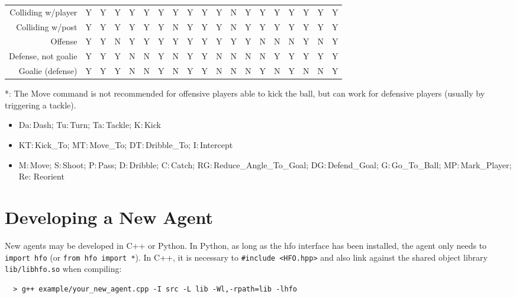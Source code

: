\documentclass[12pt]{article}
\begin{document}
\begin{center}
{\begin{tabular}{r       | c    c    c    c | c    c    c    c | c   c   c   c   c   c    c    c   c    c}
Colliding w/player      & Y  & Y  & Y  & Y & Y  & Y  & Y  & Y & Y & Y & N & Y & Y & Y  & Y  & Y & Y  & Y \\
Colliding w/post        & Y  & Y  & Y  & Y & Y  & Y  & N  & Y & Y & Y & N & Y & Y & Y  & Y  & Y & Y  & Y \\
\hline
Offense                 & Y  & Y  & N  & Y & Y  & Y  & Y  & Y & Y & Y & Y & Y & N & N  & N  & Y & N  & Y \\
Defense, not goalie     & Y  & Y  & Y  & N & N  & Y  & N  & Y & Y & N & N & N & N & Y  & Y  & Y & Y  & Y \\
Goalie (defense)        & Y  & Y  & Y  & N & N  & Y  & N  & Y & Y & N & N & N & Y & N  & Y  & N & N  & Y \\
\end{tabular}
}
\end{center}
*: The Move command is not recommended for offensive players able to kick the ball, but can work for defensive players (usually by triggering a tackle).\\
\begin{itemize}[noitemsep]
\item{Da:\,Dash; Tu:\,Turn; Ta:\,Tackle; K:\,Kick}
\item{KT:\,Kick\_To; MT:\,Move\_To; DT:\,Dribble\_To; I:\,Intercept}
\item{M:\,Move; S:\,Shoot; P:\,Pass; D:\,Dribble; C:\,Catch; RG:\,Reduce\_Angle\_To\_Goal; DG:\,Defend\_Goal; G:\,Go\_To\_Ball; MP:\,Mark\_Player; Re: Reorient}
\end{itemize}

\section{Developing a New Agent}

New agents may be developed in C++ or Python. In Python, as long as
the hfo interface has been installed, the agent only needs to
\verb+import hfo+ (or \verb+from hfo import *+). In C++, it is necessary to
\verb+#include <HFO.hpp>+ and also link against the shared object
library \verb+lib/libhfo.so+ when compiling:

\begin{verbatim}
  > g++ example/your_new_agent.cpp -I src -L lib -Wl,-rpath=lib -lhfo
\end{verbatim}



\end{document}

